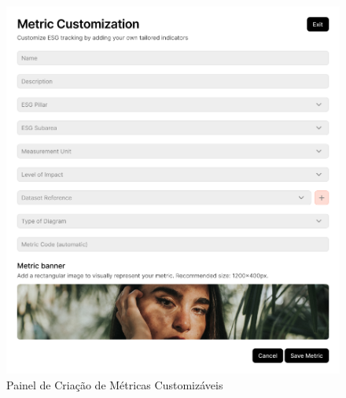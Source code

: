 \begin{figure}[H]
    \centering
    \includegraphics[width=\linewidth]{frontmatter/assets/mockup/Custom Metric Creation.png}
    \caption{Painel de Criação de Métricas Customizáveis}
    \label{fig:customMetricModal}
\end{figure}


